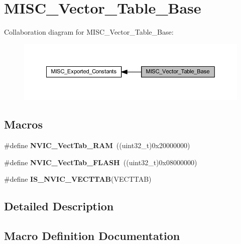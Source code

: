 \hypertarget{group___m_i_s_c___vector___table___base}{}\section{M\+I\+S\+C\+\_\+\+Vector\+\_\+\+Table\+\_\+\+Base}
\label{group___m_i_s_c___vector___table___base}
Collaboration diagram for M\+I\+S\+C\+\_\+\+Vector\+\_\+\+Table\+\_\+\+Base\+:
\nopagebreak
\begin{figure}[H]
\begin{center}
\leavevmode
\includegraphics[width=350pt]{group___m_i_s_c___vector___table___base}
\end{center}
\end{figure}
\subsection*{Macros}
\begin{DoxyCompactItemize}
\item 
\mbox{\label{group___m_i_s_c___vector___table___base_ga8be8181cc3e5d42f6204af306ab50f80}} 
\#define {\bfseries N\+V\+I\+C\+\_\+\+Vect\+Tab\+\_\+\+R\+AM}~((uint32\+\_\+t)0x20000000)
\item 
\mbox{\label{group___m_i_s_c___vector___table___base_gafbf92fd28a1090b2aa49732ebd5704b5}} 
\#define {\bfseries N\+V\+I\+C\+\_\+\+Vect\+Tab\+\_\+\+F\+L\+A\+SH}~((uint32\+\_\+t)0x08000000)
\item 
\#define {\bfseries I\+S\+\_\+\+N\+V\+I\+C\+\_\+\+V\+E\+C\+T\+T\+AB}(V\+E\+C\+T\+T\+AB)
\end{DoxyCompactItemize}


\subsection{Detailed Description}


\subsection{Macro Definition Documentation}
\mbox{\label{group___m_i_s_c___vector___table___base_ga26b9d493ccb98fcce9a27303078940c8}} 
